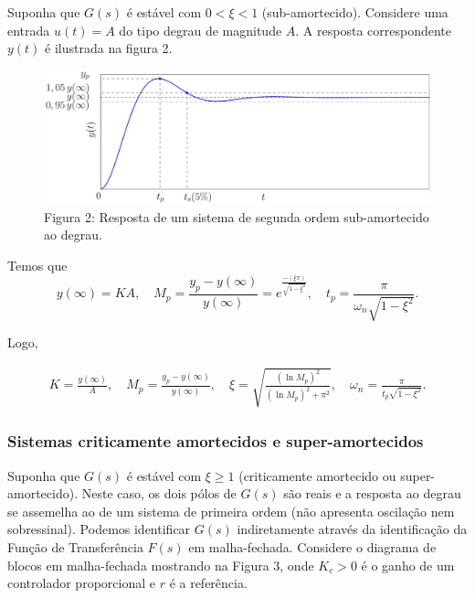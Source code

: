 \documentclass[
]{book}
\theoremstyle{definition}
\theoremstyle{definition}
\theoremstyle{definition}
\theoremstyle{remark}
\begin{document}
Suponha que \(G(s)\) é estável com \(0 < \xi < 1\) (sub-amortecido). Considere uma entrada \(u(t) = A\) do tipo degrau de magnitude \(A\). A resposta correspondente \(y(t)\) é ilustrada na figura 2.

\begin{figure}
\centering
\includegraphics{Imagens/Lab3/Explicação/fig2.jpg}
\caption{Figura 2: Resposta de um sistema de segunda ordem sub-amortecido ao degrau.}
\end{figure}

Temos que
\[
y(\infty) = KA, \quad M_p= \frac {y_p-y(\infty)}{y(\infty)} = e^{\frac {-(\xi \pi)}{\sqrt{1-\xi^2}}}, \quad
t_p = \frac {\pi}{\omega_n\sqrt{1-\xi^2}}.
\]

Logo,

\begin{align}
K = \frac {y(\infty)}{A}, \quad M_p = \frac {y_p - y(\infty)}{y(\infty)}, \quad \xi = \sqrt{\frac {(\ln{M_p})^2}{(\ln{M_p})^2+\pi^2}}, \quad \omega_n = \frac {\pi}{t_p\sqrt{1-\xi^2}}.  \label{eq:eq34}
\end{align}

\hypertarget{sistemas-criticamente-amortecidos-e-super-amortecidos}{%
\subsubsection*{Sistemas criticamente amortecidos e super-amortecidos}\label{sistemas-criticamente-amortecidos-e-super-amortecidos}}

Suponha que \(G(s)\) é estável com \(\xi \geq 1\) (criticamente amortecido ou super-amortecido). Neste caso, os dois pólos de \(G(s)\) são reais e a resposta ao degrau se assemelha ao de um sistema de primeira ordem (não apresenta oscilação nem sobressinal). Podemos identificar \(G(s)\) indiretamente através da identificação da Função de Transferência \(F(s)\) em malha-fechada. Considere o diagrama de blocos em malha-fechada mostrando na Figura 3, onde \(K_c > 0\) é o ganho de um controlador proporcional e \(r\) é a referência.
\end{document}
